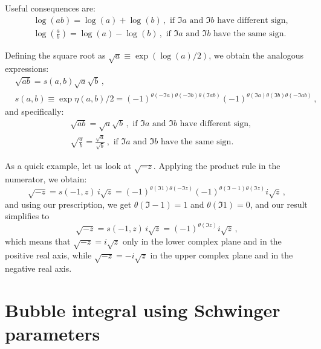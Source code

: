 \documentclass[twoside]{article}
\begin{document}
Useful consequences are:
\begin{align}
& \log(a b) = \log(a) + \log(b) \,, \text{ if $\Im a$ and $\Im b$ have different sign,}\\
& \log(\frac{a}{b}) = \log(a) - \log(b) \,, \text{ if $\Im a$ and $\Im b$ have the same sign.}
\end{align}

Defining the square root as $\sqrt{a} \equiv \exp(\log(a)/2)$, we obtain the analogous expressions:
\begin{equation}
\begin{split}
& \sqrt{a b} = s(a,b)\sqrt{a}\sqrt{b}\,, \\
& s(a,b) \equiv \exp{\eta(a,b)/2} =(-1)^{\theta(- \Im a) \theta(- \Im b) \theta(\Im ab)} (-1)^{\theta(\Im a) \theta(\Im b) \theta(-\Im ab)}
\,,
\end{split}
\end{equation}
and specifically:
\begin{align}
& \sqrt{a b} = \sqrt{a}  \sqrt{b} \,, \text{ if $\Im a$ and $\Im b$ have different sign,}\\
& \sqrt{\frac{a}{b}} = \frac{\sqrt{a}}{\sqrt{b}}\,, \text{ if $\Im a$ and $\Im b$ have the same sign.}
\end{align}

As a quick example, let us look at $\sqrt{-z}$.
Applying the product rule in the numerator, we obtain:
\begin{equation}
\sqrt{-z} = s(-1,z)\, i \sqrt{z} =  (-1)^{\theta(\Im 1) \theta(- \Im z)} (-1)^{\theta(\Im -1) \theta(\Im z)} i \sqrt{z}\,,
\end{equation}
and using our prescription, we get $\theta(\Im -1) = 1$ and $\theta(\Im 1) = 0$, and our result simplifies to 
\begin{equation}
\sqrt{-z} = s(-1,z)\, i \sqrt{z} =  (-1)^{\theta(\Im z)} i \sqrt{z}\,,
\end{equation}
which means that $\sqrt{-z} = i\sqrt{z}$ only in the lower complex plane and in the positive real axis, while $\sqrt{-z} = -i\sqrt{z}$ in the upper complex plane and in the negative real axis.


\section{Bubble integral using Schwinger parameters}
\end{document}
